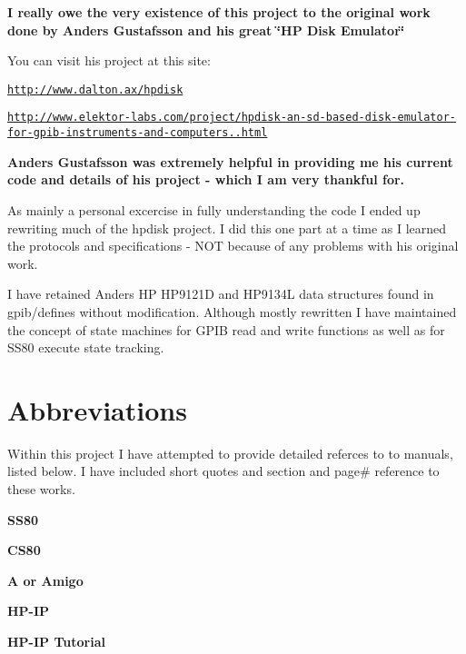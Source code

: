 {\bfseries I really owe the very existence of this project to the original work done by Anders Gustafsson and his great \char`\"{}\-H\-P Disk Emulator\char`\"{} }
\begin{DoxyItemize}
\item You can visit his project at this site\-:
\begin{DoxyItemize}
\item \href{http://www.dalton.ax/hpdisk}{\tt http\-://www.\-dalton.\-ax/hpdisk}
\item \href{http://www.elektor-labs.com/project/hpdisk-an-sd-based-disk-emulator-for-gpib-instruments-and-computers.13693.html}{\tt http\-://www.\-elektor-\/labs.\-com/project/hpdisk-\/an-\/sd-\/based-\/disk-\/emulator-\/for-\/gpib-\/instruments-\/and-\/computers..\-html}
\end{DoxyItemize}
\end{DoxyItemize}

{\bfseries Anders Gustafsson was extremely helpful in providing me his current code and details of his project -\/ which I am very thankful for.}

As mainly a personal excercise in fully understanding the code I ended up rewriting much of the hpdisk project. I did this one part at a time as I learned the protocols and specifications -\/ N\-O\-T because of any problems with his original work.

I have retained Anders H\-P H\-P9121\-D and H\-P9134\-L data structures found in gpib/defines without modification. Although mostly rewritten I have maintained the concept of state machines for G\-P\-I\-B read and write functions as well as for S\-S80 execute state tracking.



 \section*{Abbreviations}

Within this project I have attempted to provide detailed referces to to manuals, listed below. I have included short quotes and section and page\# reference to these works.
\begin{DoxyItemize}
\item {\bfseries S\-S80}
\item {\bfseries C\-S80}
\item {\bfseries A or Amigo}
\item {\bfseries H\-P-\/\-I\-P}
\item {\bfseries H\-P-\/\-I\-P Tutorial}
\end{DoxyItemize}

